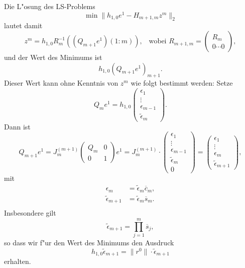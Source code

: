 
Die L"osung des LS-Problems
\[\min \|h_{1,0} e^1 - H_{m+1,m} z^m \|_2 \]
lautet damit
$$ z^m = h_{1,0} R_m^{-1} ((Q_{m+1} e^1)(1:m)), \enspace \mbox{ wobei }
 R_{m+1,m} = \left( \begin{array}{c} R_m \\
                    0 \cdots 0
                    \end{array}
             \right),
$$
und der Wert des Minimums ist
$$ h_{1,0} ( Q_{m+1} e^1)_{m+1}. $$
Dieser Wert kann ohne Kenntnis von $z^m$ wie folgt bestimmt werden:
Setze 
$$ Q_m e^1=h_{1,0} \left(\begin{array}{c}
                        \epsilon_1\\
                        \vdots\\
                        \epsilon_{m-1} \\
                        \tilde{\epsilon}_{m}
               \end{array}\right). $$
Dann ist
\[
Q_{m+1}e^1 = J_m^{(m+1)} \left( \begin{array}{cc} Q_m & 0 \\
                                               0 & 1 
                                  \end{array}
                         \right) e^1
 = J_m^{(m+1)} \cdot
      \left(\begin{array}{c}
                        \epsilon_1\\
                        \vdots\\
                        \epsilon_{m-1} \\
                        \tilde{\epsilon}_{m} \\
                          0
               \end{array}\right)
 =
\left(\begin{array}{c}
                        \epsilon_1\\
                        \vdots\\
                        \epsilon_{m} \\
                        \tilde{\epsilon}_{m+1}
               \end{array}\right),
\]
mit
\begin{align*}
  \epsilon_m & =  \tilde{\epsilon}_m\overline{c}_m, \\
  \tilde{\epsilon}_{m+1} & =  \tilde{\epsilon}_m\overline{s}_m. \\
\end{align*}
Insbesondere gilt
$$ \tilde{\epsilon}_{m+1} = \prod \limits_{j=1}^{m} \overline{s}_j ,$$
so dass wir f"ur den Wert des Minimums den Ausdruck
\[
  h_{1,0}\tilde{\epsilon}_{m+1} = \|r^0\| \cdot \tilde{\epsilon}_{m+1}
\]
erhalten.

